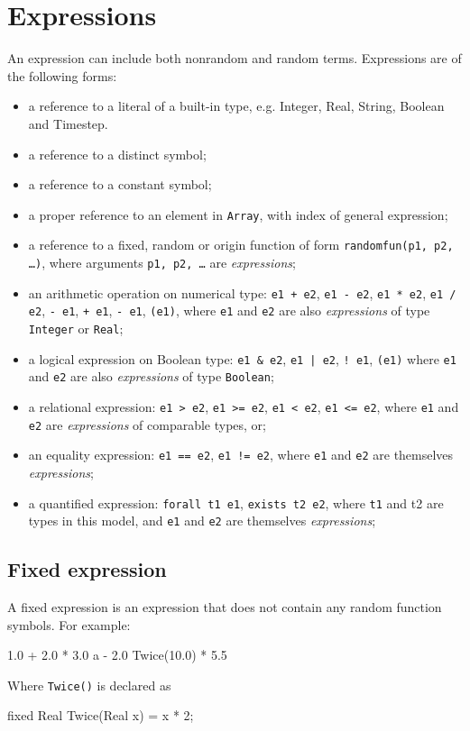 \documentclass[12pt]{article}
\begin{document}
\section{Expressions}
\label{sec:expression}
An expression can include both nonrandom and random terms.  Expressions are of the following forms:
\begin{itemize}
\item a reference to a literal of a built-in type, e.g. Integer, Real, String, Boolean and Timestep.
\item a reference to a distinct symbol;
\item a reference to a constant symbol;
\item a proper reference to an element in {\tt Array}, with index of general expression;
\item a reference to a fixed, random or origin function of form {\tt randomfun(p1, p2, \dots)}, where arguments {\tt p1, p2, \dots} are \emph{expressions};
\item an arithmetic operation on numerical type: \texttt{e1 + e2}, \texttt{e1 - e2}, \texttt{e1 * e2}, \texttt{e1 / e2},  \texttt{- e1}, \texttt{+ e1}, \texttt{- e1}, \texttt{(e1)}, where \texttt{e1} and \texttt{e2} are also \emph{expressions} of type \texttt{Integer} or \texttt{Real};
\item a logical expression on Boolean type: \texttt{e1 \& e2}, \texttt{e1 | e2}, \texttt{! e1}, \texttt{(e1)} where 
\texttt{e1} and \texttt{e2} are also \emph{expressions} of type \texttt{Boolean};
\item a relational expression: \texttt{e1 > e2}, \texttt{e1 >= e2}, \texttt{e1 < e2}, \texttt{e1 <= e2}, where \texttt{e1} and \texttt{e2} are \emph{expressions} of comparable types, or;
\item an equality expression: \texttt{e1 == e2}, \texttt{e1 != e2}, where \texttt{e1} and \texttt{e2} are themselves \emph{expressions};
\item a quantified expression: \texttt{forall t1 e1}, \texttt{exists t2 e2}, where \texttt{t1} and {t2} are types in this \bl model, and \texttt{e1} and \texttt{e2} are themselves \emph{expressions};
\end{itemize}

\subsection{Fixed expression}
A fixed expression is an expression that does not contain any random function symbols. 
For example:
\begin{blogcode}
1.0 + 2.0 * 3.0
a - 2.0
Twice(10.0) * 5.5
\end{blogcode}
Where \texttt{Twice(\mycdot)} is declared as 
\begin{blogcode}
fixed Real Twice(Real x) = x * 2;
\end{blogcode}
\end{document}
